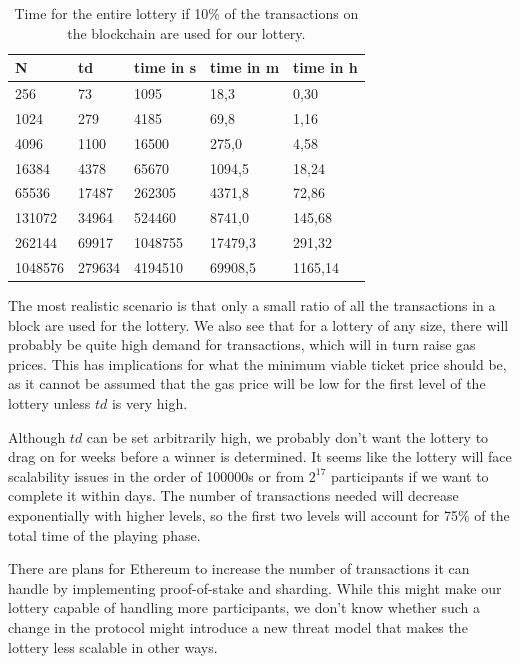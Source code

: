 \begin{table}[h]
\centering
\caption{Time for the entire lottery if 10\% of the transactions on the blockchain are used for our lottery.}
\label{tab:total-time-10percent-transactions}
\begin{tabular}{|l|l|l|l|l|}
\hline

N & td & time in s & time in m & time in h \\ \hline
256 & 73 & 1095 & 18,3 & 0,30 \\ \hline
1024 & 279 & 4185 & 69,8 & 1,16 \\ \hline
4096 & 1100 & 16500 & 275,0 & 4,58 \\ \hline
16384 & 4378 & 65670 & 1094,5 & 18,24 \\ \hline
65536 & 17487 & 262305 & 4371,8 & 72,86 \\ \hline
131072 & 34964 & 524460 & 8741,0 & 145,68 \\ \hline
262144 & 69917 & 1048755 & 17479,3 & 291,32 \\ \hline
1048576 & 279634 & 4194510 & 69908,5 & 1165,14 \\ \hline

\end{tabular}
\end{table}

The most realistic scenario is that only a small ratio of all the transactions in a block are used for the lottery. We also see that for a lottery of any size, there will probably be quite high demand for transactions, which will in turn raise gas prices. This has implications for what the minimum viable ticket price should be, as it cannot be assumed that the gas price will be low for the first level of the lottery unless $td$ is very high.

Although $td$ can be set arbitrarily high, we probably don't want the lottery to drag on for weeks before a winner is determined. It seems like the lottery will face scalability issues in the order of 100000s or from $2^{17}$ participants if we want to complete it within days. The number of transactions needed will decrease exponentially with higher levels, so the first two levels will account for 75\% of the total time of the playing phase. 

There are plans for Ethereum to increase the number of transactions it can handle by implementing proof-of-stake and sharding. While this might make our lottery capable of handling more participants, we don't know whether such a change in the protocol might introduce a new threat model that makes the lottery less scalable in other ways.

